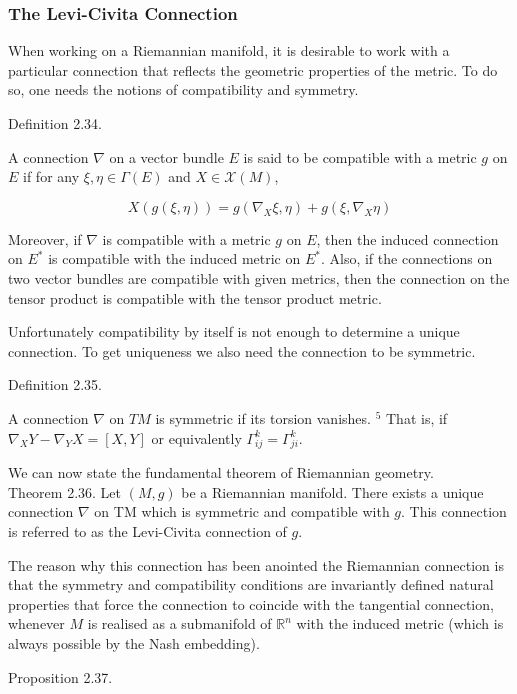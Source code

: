 \documentclass[10pt, letterpaper]{article}
\begin{document}
\subsubsection*{The Levi-Civita Connection}



When working on a Riemannian manifold, it is desirable to work with a particular connection that reflects the geometric properties of the metric. To do so, one needs the notions of compatibility and symmetry.

Definition 2.34. 

A connection $\nabla$ on a vector bundle $E$ is said to be compatible with a metric $g$ on $E$ if for any $\xi, \eta \in \Gamma(E)$ and $X \in \mathscr{X}(M)$,

$$
X(g(\xi, \eta))=g\left(\nabla_{X} \xi, \eta\right)+g\left(\xi, \nabla_{X} \eta\right)
$$

Moreover, if $\nabla$ is compatible with a metric $g$ on $E$, then the induced connection on $E^{*}$ is compatible with the induced metric on $E^{*}$. Also, if the connections on two vector bundles are compatible with given metrics, then the connection on the tensor product is compatible with the tensor product metric.

Unfortunately compatibility by itself is not enough to determine a unique connection. To get uniqueness we also need the connection to be symmetric.



Definition 2.35.

A connection $\nabla$ on $T M$ is symmetric if its torsion vanishes. ${ }^{5}$ That is, if $\nabla_{X} Y-\nabla_{Y} X=[X, Y]$ or equivalently $\Gamma_{i j}^{k}=\Gamma_{j i}^{k}$.

We can now state the fundamental theorem of Riemannian geometry.\\
Theorem 2.36. Let $(M, g)$ be a Riemannian manifold. There exists a unique connection $\nabla$ on TM which is symmetric and compatible with $g$. This connection is referred to as the Levi-Civita connection of $g$.

The reason why this connection has been anointed the Riemannian connection is that the symmetry and compatibility conditions are invariantly defined natural properties that force the connection to coincide with the tangential connection, whenever $M$ is realised as a submanifold of $\mathbb{R}^{n}$ with the induced metric (which is always possible by the Nash embedding).

Proposition 2.37. 
\end{document}

